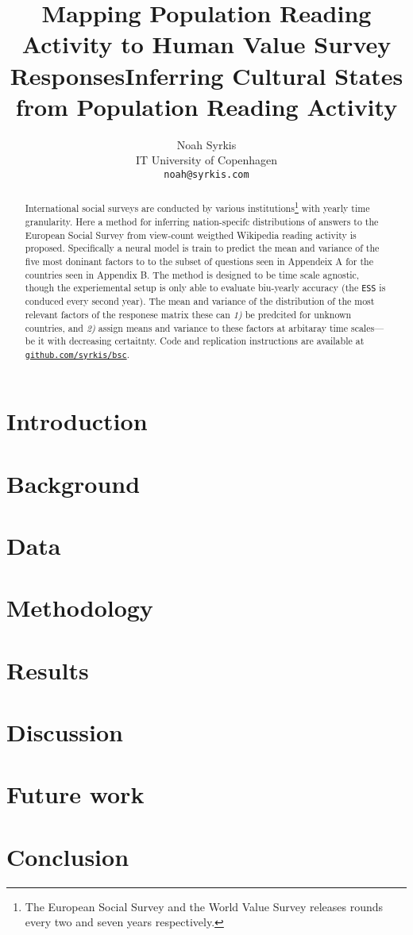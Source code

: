 \documentclass[11pt]{article}
\title{Mapping Population Reading Activity to Human Value Survey Responses}
\title{Inferring Cultural States from Population Reading Activity}
\author{Noah Syrkis \\
  IT University of Copenhagen \\
  \texttt{noah@syrkis.com} \\}
\begin{document}
\maketitle
\begin{abstract}
    International social surveys are conducted by various institutions\footnote{The European Social Survey and the World Value Survey releases rounds every two and seven years respectively.} with yearly time granularity.
    Here a method for inferring nation-specifc distributions of answers to the European Social Survey from view-count weigthed Wikipedia reading activity is proposed.
    Specifically a neural model is train to predict the mean and variance of the five most doninant factors to to the subset of questions seen in Appendeix A for the countries seen in Appendix B.
    The method is designed to be time scale agnostic, though the experiemental setup is only able to evaluate biu-yearly accuracy (the \texttt{ESS} is conduced every second year).
    The mean and variance of the distribution of the most relevant factors of the responese matrix these can \emph{1)} be predcited for unknown countries, and \emph{2)} assign means and variance to these factors at arbitaray time scales—be it with decreasing certaitnty.
    Code and replication instructions are available at \href{https://github.com/syrkis/bsc}{\texttt{github.com/syrkis/bsc}}.

\end{abstract}

\section{Introduction}


\section{Background}


\section{Data}


\section{Methodology}


\section{Results}


\section{Discussion}


\section{Future work}


\section{Conclusion}



\end{document}
